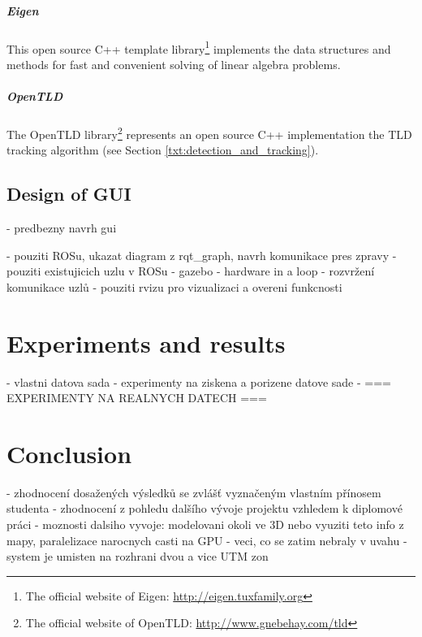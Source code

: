 \paragraph{Eigen} This open source C++ template library\footnote{The official website of Eigen: \url{http://eigen.tuxfamily.org}} implements the data structures and methods for fast and convenient solving of linear algebra problems.

\paragraph{OpenTLD} The OpenTLD library\footnote{The official website of OpenTLD: \url{http://www.gnebehay.com/tld}} represents an open source C++ implementation the TLD tracking algorithm (see Section \ref{txt:detection_and_tracking}).


\section{Design of GUI}
- predbezny navrh gui




- pouziti ROSu, ukazat diagram z rqt\_graph, navrh komunikace pres zpravy
- pouziti existujicich uzlu v ROSu
- gazebo - hardware in a loop
- rozvržení komunikace uzlů
- pouziti rvizu pro vizualizaci a overeni funkcnosti


	



\chapter{Experiments and results}

- vlastni datova sada
- experimenty na ziskena a porizene datove sade
- === EXPERIMENTY NA REALNYCH DATECH ===

\chapter{Conclusion}

- zhodnocení dosažených výsledků se zvlášť vyznačeným vlastním přínosem studenta
- zhodnocení z pohledu dalšího vývoje projektu vzhledem k diplomové práci
- moznosti dalsiho vyvoje: modelovani okoli ve 3D nebo vyuziti teto info z mapy, paralelizace narocnych casti na GPU
- veci, co se zatim nebraly v uvahu
	- system je umisten na rozhrani dvou a vice UTM zon


